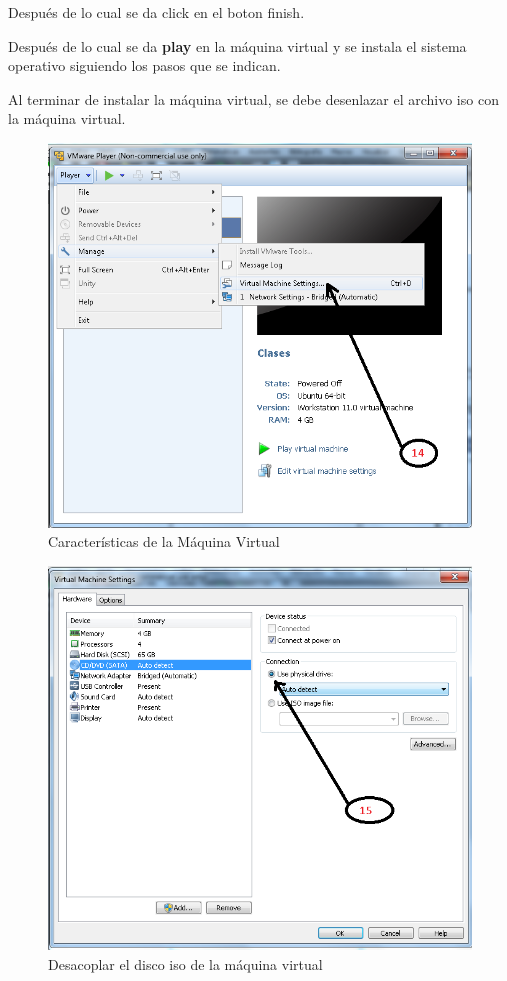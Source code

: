 \documentclass[12pt, twoside]{report}
\begin{document}
Después de lo cual se da click en el boton finish.

Después de lo cual se da \textbf{play} en la máquina virtual y se instala el sistema operativo siguiendo los pasos que se indican.

Al terminar de instalar la máquina virtual, se debe desenlazar el archivo iso con la máquina virtual.

\begin{figure}
	\centering
	\includegraphics[width=1.0\linewidth]{VMwarePlayer14.png}
	\caption{Características de la Máquina Virtual}
	\label{fig1014}
\end{figure}

\begin{figure}
	\centering
	\includegraphics[width=1.0\linewidth]{VMwarePlayerFin.png}
	\caption{Desacoplar el disco iso de la máquina virtual}
	\label{fig1015}
\end{figure}
\end{document}
